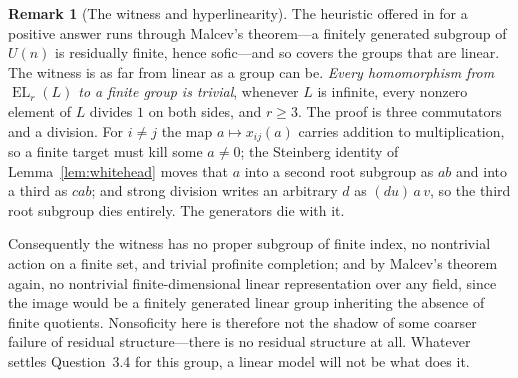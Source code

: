 \documentclass[11pt]{amsart}
\theoremstyle{definition}
\newtheorem{remark}[theorem]{Remark}
\theoremstyle{plain}
\newcommand{\EL}{\operatorname{EL}}
\begin{document}
\begin{remark}[The witness and hyperlinearity]
The heuristic offered in \cite{Pestov08} for a positive answer runs through Malcev's theorem---a finitely generated subgroup of \(U(n)\) is residually finite, hence sofic---and so covers the groups that are linear.  The witness is as far from linear as a group can be.  \emph{Every homomorphism from \(\EL_r(L)\) to a finite group is trivial}, whenever \(L\) is infinite, every nonzero element of \(L\) divides \(1\) on both sides, and \(r\geq3\).  The proof is three commutators and a division.  For \(i\ne j\) the map \(a\mapsto x_{ij}(a)\) carries addition to multiplication, so a finite target must kill some \(a\ne0\); the Steinberg identity of Lemma~\ref{lem:whitehead} moves that \(a\) into a second root subgroup as \(ab\) and into a third as \(cab\); and strong division writes an arbitrary \(d\) as \((du)\,a\,v\), so the third root subgroup dies entirely.  The generators die with it.

Consequently the witness has no proper subgroup of finite index, no nontrivial action on a finite set, and trivial profinite completion; and by Malcev's theorem again, no nontrivial finite-dimensional linear representation over any field, since the image would be a finitely generated linear group inheriting the absence of finite quotients.  Nonsoficity here is therefore not the shadow of some coarser failure of residual structure---there is no residual structure at all.  Whatever settles Question~3.4 for this group, a linear model will not be what does it.
\end{remark}
\end{document}
